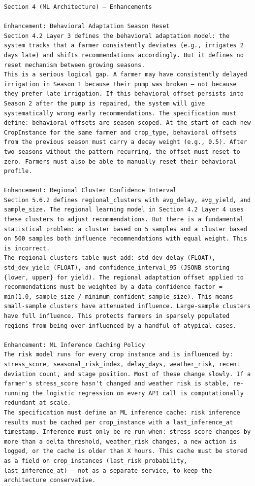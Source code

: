 \documentclass{article}
\begin{document}
\begin{verbatim}
Section 4 (ML Architecture) — Enhancements

Enhancement: Behavioral Adaptation Season Reset
Section 4.2 Layer 3 defines the behavioral adaptation model: the system tracks that a farmer consistently deviates (e.g., irrigates 2 days late) and shifts recommendations accordingly. But it defines no reset mechanism between growing seasons.
This is a serious logical gap. A farmer may have consistently delayed irrigation in Season 1 because their pump was broken — not because they prefer late irrigation. If this behavioral offset persists into Season 2 after the pump is repaired, the system will give systematically wrong early recommendations. The specification must define: behavioral offsets are season-scoped. At the start of each new CropInstance for the same farmer and crop_type, behavioral offsets from the previous season must carry a decay weight (e.g., 0.5). After two seasons without the pattern recurring, the offset must reset to zero. Farmers must also be able to manually reset their behavioral profile.

Enhancement: Regional Cluster Confidence Interval
Section 5.6.2 defines regional_clusters with avg_delay, avg_yield, and sample_size. The regional learning model in Section 4.2 Layer 4 uses these clusters to adjust recommendations. But there is a fundamental statistical problem: a cluster based on 5 samples and a cluster based on 500 samples both influence recommendations with equal weight. This is incorrect.
The regional_clusters table must add: std_dev_delay (FLOAT), std_dev_yield (FLOAT), and confidence_interval_95 (JSONB storing {lower, upper} for yield). The regional adaptation offset applied to recommendations must be weighted by a data_confidence_factor = min(1.0, sample_size / minimum_confident_sample_size). This means small-sample clusters have attenuated influence. Large-sample clusters have full influence. This protects farmers in sparsely populated regions from being over-influenced by a handful of atypical cases.

Enhancement: ML Inference Caching Policy
The risk model runs for every crop instance and is influenced by: stress_score, seasonal_risk_index, delay_days, weather_risk, recent deviation count, and stage position. Most of these change slowly. If a farmer's stress_score hasn't changed and weather risk is stable, re-running the logistic regression on every API call is computationally redundant at scale.
The specification must define an ML inference cache: risk inference results must be cached per crop_instance with a last_inference_at timestamp. Inference must only be re-run when: stress_score changes by more than a delta threshold, weather_risk changes, a new action is logged, or the cache is older than X hours. This cache must be stored as a field on crop_instances (last_risk_probability, last_inference_at) — not as a separate service, to keep the architecture conservative.


\end{verbatim}
\end{document}

